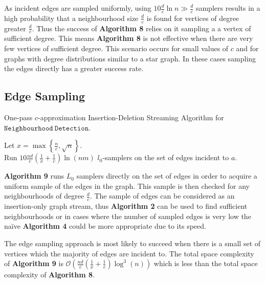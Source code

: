 \documentclass[11pt,twoside,a4paper]{report}
\begin{document}
\par As incident edges are sampled uniformly, using $10\frac{d}c\ln n\gg\frac{d}c$ samplers results in a high probability that a neighbourhood size $\frac{d}c$ is found for vertices of degree greater $\frac{d}c$. Thus the success of \textbf{Algorithm 8} relies on it sampling a a vertex of sufficient degree. This means \textbf{Algorithm 8} is not effective when there are very few vertices of sufficient degree. This scenario occurs for small values of $c$ and for graphs with degree distributions similar to a star graph. In these cases sampling the edges directly has a greater success rate.

\subsection{Edge Sampling}

\begin{algorithm}
	\caption{One-pass $c$-approximation Insertion-Deletion Streaming Algorithm for $\mathtt{Neighbourhood\ Detection}$. }
	Let $x=\max\left\{\frac{n}{c},\sqrt{n}\right\}$.\\
	Run $10\frac{nd}{c}\left(\frac1x+\frac1c\right)\ln (nm)$ $l_0$-samplers on the set of edges incident to $a$.\\
\end{algorithm}

\par\textbf{Algorithm 9} runs $L_0$ samplers directly on the set of edges in order to acquire a uniform sample of the edges in the graph. This sample is then checked for any neighbourhoods of degree $\frac{d}c$. The sample of edges can be considered as an insertion-only graph stream, thus \textbf{Algorithm 2} can be used to find sufficient neighbourhoods or in cases where the number of sampled edges is very low the naïve \textbf{Algorithm 4} could be more appropriate due to its speed.
\par The edge sampling approach is most likely to succeed when there is a small set of vertices which the majority of edges are incident to. The total space complexity of \textbf{Algorithm 9} is $\mathcal{O}\left(\frac{nd}c\left(\frac1x+\frac1c\right)\log^3(n)\right)$ which is less than the total space complexity of \textbf{Algorithm 8}. %
\end{document}
